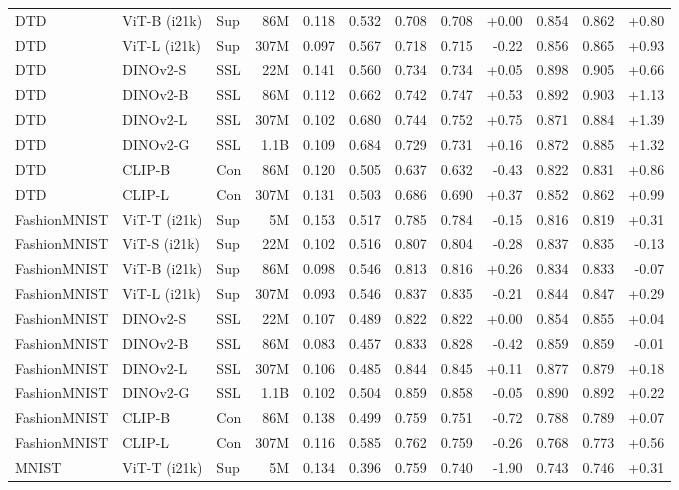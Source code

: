 \begin{table}[!htbp]
\begin{tabular}{lllrrr|rrr|rrr}
DTD & ViT-B (i21k) & Sup & 86M & 0.118 & 0.532 & 0.708 & 0.708 & +0.00 & 0.854 & 0.862 & +0.80 \\
DTD & ViT-L (i21k) & Sup & 307M & 0.097 & 0.567 & 0.718 & 0.715 & -0.22 & 0.856 & 0.865 & +0.93 \\
DTD & DINOv2-S & SSL & 22M & 0.141 & 0.560 & 0.734 & 0.734 & +0.05 & 0.898 & 0.905 & +0.66 \\
DTD & DINOv2-B & SSL & 86M & 0.112 & 0.662 & 0.742 & 0.747 & +0.53 & 0.892 & 0.903 & +1.13 \\
DTD & DINOv2-L & SSL & 307M & 0.102 & 0.680 & 0.744 & 0.752 & +0.75 & 0.871 & 0.884 & +1.39 \\
DTD & DINOv2-G & SSL & 1.1B & 0.109 & 0.684 & 0.729 & 0.731 & +0.16 & 0.872 & 0.885 & +1.32 \\
DTD & CLIP-B & Con & 86M & 0.120 & 0.505 & 0.637 & 0.632 & -0.43 & 0.822 & 0.831 & +0.86 \\
DTD & CLIP-L & Con & 307M & 0.131 & 0.503 & 0.686 & 0.690 & +0.37 & 0.852 & 0.862 & +0.99 \\
\midrule
FashionMNIST & ViT-T (i21k) & Sup & 5M & 0.153 & 0.517 & 0.785 & 0.784 & -0.15 & 0.816 & 0.819 & +0.31 \\
FashionMNIST & ViT-S (i21k) & Sup & 22M & 0.102 & 0.516 & 0.807 & 0.804 & -0.28 & 0.837 & 0.835 & -0.13 \\
FashionMNIST & ViT-B (i21k) & Sup & 86M & 0.098 & 0.546 & 0.813 & 0.816 & +0.26 & 0.834 & 0.833 & -0.07 \\
FashionMNIST & ViT-L (i21k) & Sup & 307M & 0.093 & 0.546 & 0.837 & 0.835 & -0.21 & 0.844 & 0.847 & +0.29 \\
FashionMNIST & DINOv2-S & SSL & 22M & 0.107 & 0.489 & 0.822 & 0.822 & +0.00 & 0.854 & 0.855 & +0.04 \\
FashionMNIST & DINOv2-B & SSL & 86M & 0.083 & 0.457 & 0.833 & 0.828 & -0.42 & 0.859 & 0.859 & -0.01 \\
FashionMNIST & DINOv2-L & SSL & 307M & 0.106 & 0.485 & 0.844 & 0.845 & +0.11 & 0.877 & 0.879 & +0.18 \\
FashionMNIST & DINOv2-G & SSL & 1.1B & 0.102 & 0.504 & 0.859 & 0.858 & -0.05 & 0.890 & 0.892 & +0.22 \\
FashionMNIST & CLIP-B & Con & 86M & 0.138 & 0.499 & 0.759 & 0.751 & -0.72 & 0.788 & 0.789 & +0.07 \\
FashionMNIST & CLIP-L & Con & 307M & 0.116 & 0.585 & 0.762 & 0.759 & -0.26 & 0.768 & 0.773 & +0.56 \\
\midrule
MNIST & ViT-T (i21k) & Sup & 5M & 0.134 & 0.396 & 0.759 & 0.740 & -1.90 & 0.743 & 0.746 & +0.31 \\

\end{tabular}
\end{table}
